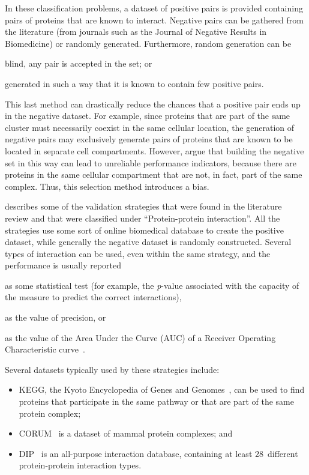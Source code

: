 In these classification problems, a dataset of positive pairs is provided containing pairs of proteins that are known to interact. Negative pairs can be gathered from the literature (\eg from journals such as the Journal of Negative Results in Biomedicine) or randomly generated. Furthermore, random generation can be
\begin{paralist}
    \item blind, \ie any pair is accepted in the set; or
    \item generated in such a way that it is known to contain few positive pairs.
\end{paralist}
This last method can drastically reduce the chances that a positive pair ends up in the negative dataset. For example, since proteins that are part of the same cluster must necessarily coexist in the same cellular location, the generation of negative pairs may exclusively generate pairs of proteins that are known to be located in separate cell compartments. However, \citet{Ben-Hur2006} argue that building the negative set in this way can lead to unreliable performance indicators, because there are proteins in the same cellular compartment that are not, in fact, part of the same complex. Thus, this selection method introduces a bias.

 describes some of the validation strategies that were found in the literature review and that were classified under ``Protein-protein interaction''. All the strategies use some sort of online biomedical database to create the positive dataset, while generally the negative dataset is randomly constructed. Several types of interaction can be used, even within the same strategy, and the performance is usually reported
\begin{paralist}
    \item as some statistical test (for example, the \emph{p}-value associated with the capacity of the measure to predict the correct interactions),
    \item as the value of precision, or
    \item as the value of the Area Under the Curve (AUC) of a Receiver Operating Characteristic curve~\citep{Fawcett2004,Fawcett2006}.
\end{paralist}

Several datasets typically used by these strategies include:
\begin{itemize}
    \item KEGG, the Kyoto Encyclopedia of Genes and Genomes~\citep{Ogata1999}, can be used to find proteins that participate in the same pathway or that are part of the same protein complex;
    \item CORUM~\citep{Ruepp2008} is a dataset of mammal protein complexes; and
    \item DIP~\citep{Salwinski2004} is an all-purpose interaction database, containing at least $28$~different protein-protein interaction types.
\end{itemize}


